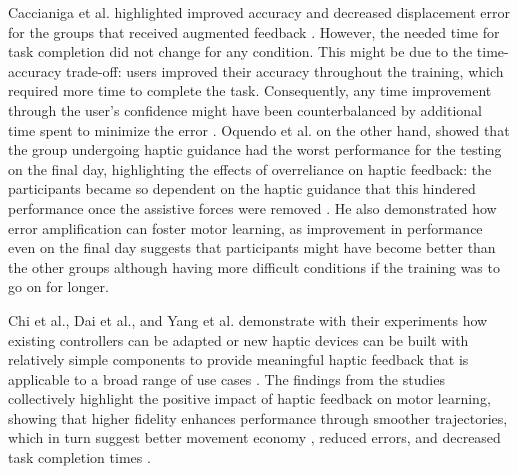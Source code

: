 Caccianiga et al. highlighted improved accuracy and decreased displacement error for the groups that received augmented feedback \cite{Caccianiga2021}. However, the needed time for task completion did not change for any condition. This might be due to the time-accuracy trade-off: users improved their accuracy throughout the training, which required more time to complete the task. Consequently, any time improvement through the user's confidence might have been counterbalanced by additional time spent to minimize the error \cite{Caccianiga2021}. 
Oquendo et al. on the other hand, showed that the group undergoing haptic guidance had the worst performance for the testing on the final day, highlighting the effects of overreliance on haptic feedback: the participants became so dependent on the haptic guidance that this hindered performance once the assistive forces were removed \cite{Oquendo2024}. He also demonstrated how error amplification can foster motor learning, as improvement in performance even on the final day suggests that participants might have become better than the other groups although having more difficult conditions if the training was to go on for longer.

Chi et al., Dai et al., and Yang et al. demonstrate with their experiments how existing controllers can be adapted or new haptic devices can be built with relatively simple components to provide meaningful haptic feedback that is applicable to a broad range of use cases \cite{Chi2017, Dai2023, Yang2023}. The findings from the studies collectively highlight the positive impact of haptic feedback on motor learning, showing that higher fidelity enhances performance through smoother trajectories, which in turn suggest better movement economy \cite{Chi2017}, reduced errors, and decreased task completion times \cite{Dai2023, Yang2023}. 

